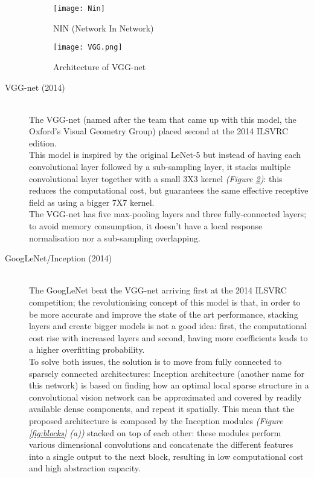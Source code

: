 \documentclass[../main.tex]{subfiles}
\begin{document}
\begin{description}
\vspace*{5mm}
\begin{figure}[H]
  \centering
  \texttt{[image: Nin]}
  \caption{NIN (Network In Network) \cite{Lin2013}}
  \label{fig:nin}
\end{figure}
\clearpage
\newpage

\begin{figure}[H]
  \centering
  \texttt{[image: VGG.png]}
  \caption{Architecture of VGG-net \cite{VGG}}
  \label{fig:vggnet}
\end{figure}

\item[VGG-net (2014)] \cite{Simonyan2015} \hfill \\
The VGG-net (named after the team that came up with this model, the Oxford's Visual Geometry Group) placed second at the 2014 ILSVRC edition. \\ This model is inspired by the original LeNet-5 \cite{LeCun1998} but instead of having each convolutional layer followed by a sub-sampling layer, it stacks multiple convolutional layer together with a small 3X3 kernel \textit{(Figure \ref{fig:vggnet})}: this reduces the computational cost, but guarantees the same effective receptive field as using a bigger 7X7 kernel.\cite{Simonyan2015} \\
The VGG-net has five max-pooling layers and three fully-connected layers; to avoid memory consumption, it doesn't have a local response normalisation nor a sub-sampling overlapping. \\

\item[GoogLeNet/Inception (2014)] \cite{Szegedy2015} \hfill \\ 
The GoogLeNet beat the VGG-net arriving first at the 2014 ILSVRC competition; the revolutionising concept of this model is that, in order to be more accurate and improve the state of the art performance, stacking layers and create bigger models is not a good idea: first, the computational cost rise with increased layers and second, having more coefficients leads to a higher overfitting probability. \\ 
To solve both issues, the solution is to move from fully connected to sparsely connected architectures: Inception architecture (another name for this network) is based on finding how an optimal local sparse structure in a convolutional vision network can be approximated and covered by readily available dense components, and repeat it spatially.\cite{Szegedy2015}
This mean that the proposed architecture is composed by the Inception modules \textit{(Figure \ref{fig:blocks} (a))} stacked on top of each other: these modules perform various dimensional convolutions and concatenate the different features into a single output to the next block, resulting in low computational cost and high abstraction capacity.\\


\end{description}
\end{document}
